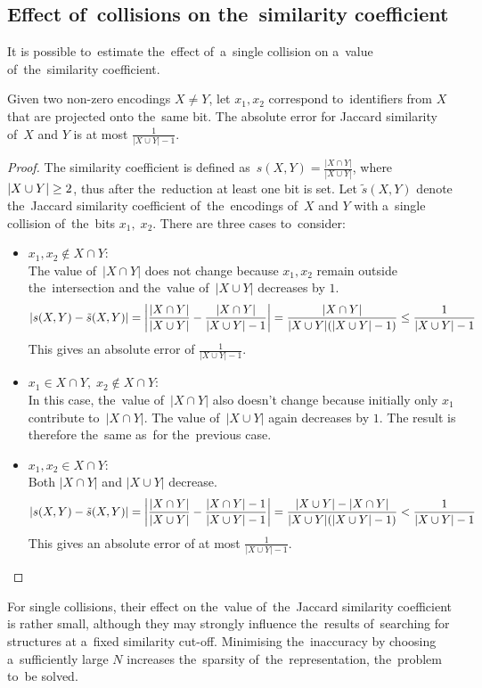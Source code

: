 \subsection{Effect of~collisions on the~similarity coefficient}
It is possible to~estimate the~effect of~a~single collision on a~value of~the~similarity coefficient.
\begin{propos}
    Given two non-zero encodings \( X \neq Y \),\: let \( x_1, x_2 \) correspond to~identifiers from \( X \) that are projected onto the~same bit. The absolute error for Jaccard similarity of~\( X \) and \( Y \) is at most \( \frac{1}{|X \cup Y| - 1} \).
\end{propos}
\begin{proof}
    The similarity coefficient is defined as~\( s(X,Y) = \frac{|X \cap Y|}{|X \cup Y|} \), where \( \left| X \cup Y \right| \geq 2 \), thus after the~reduction at least one bit is set. Let \( \tilde{s}(X,Y) \) denote the~Jaccard similarity coefficient of~the~encodings of~\( X \) and \( Y \) with a~single collision of~the~bits \( x_1,\; x_2 \). There are three cases to~consider:
    \begin{itemize}
        \item \( x_1, x_2 \notin X \cap Y \): \\
        The value of~\( |X \cap Y| \) does not change because \( x_1, x_2 \) remain outside the~intersection and the~value of~\( |X \cup Y| \) decreases by \( 1 \).
        \[
            \left| s(X,Y) - \tilde{s}(X,Y) \right| = \left| \frac{|X \cap Y|}{|X \cup Y|} - \frac{|X \cap Y|}{|X \cup Y|-1} \right| = \frac{|X \cap Y|}{|X \cup Y|(|X \cup Y|-1)} \leq \frac{1}{|X \cup Y| - 1}
        \]
        This gives an absolute error of \( \frac{1}{|X \cup Y|-1} \).
        
        \item \( x_1 \in X \cap Y,\; x_2 \notin X \cap Y \): \\
         In this case, the~value of~\( |X \cap Y| \) also doesn't change because initially only \( x_1 \) contribute to~\( |X \cap Y| \). The value of~\( |X \cup Y| \) again decreases by \( 1 \). The result is therefore the~same as~for the~previous case.
         
        \item \( x_1, x_2 \in X \cap Y \): \\
        Both \( |X \cap Y| \) and \( |X \cup Y| \) decrease.
        \[
            \left| s(X,Y) - \tilde{s}(X,Y) \right| = \left| \frac{|X \cap Y|}{|X \cup Y|} - \frac{|X \cap Y|-1}{|X \cup Y|-1} \right| = \frac{|X \cup Y|-|X \cap Y|}{|X \cup Y|(|X \cup Y|-1)} < \frac{1}{|X \cup Y|-1}
        \]
        This gives an absolute error of at most \( \frac{1}{|X \cup Y|-1} \).
    \end{itemize}
\end{proof}
For single collisions, their effect on the~value of~the~Jaccard similarity coefficient is rather small, although they may strongly influence the~results of~searching for structures at a~fixed similarity cut-off. Minimising the~inaccuracy by choosing a~sufficiently large \( N \) increases the~sparsity of~the~representation, the~problem to~be solved.